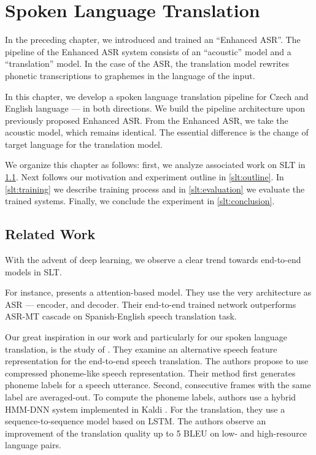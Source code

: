 \chapter{Spoken Language Translation}
\label{chap:slt}
In the preceding chapter, we introduced and trained an ``Enhanced ASR''. The pipeline of the Enhanced ASR system consists of an ``acoustic'' model and a ``translation'' model. In the case of the ASR, the translation model rewrites phonetic transcriptions to graphemes in the language of the input. 

In this chapter, we develop a spoken language translation pipeline for Czech and English language --- in both directions. We build the pipeline architecture upon previously proposed Enhanced ASR. From the Enhanced ASR, we take the acoustic model, which remains identical. The essential difference is the change of target language for the translation model. 

We organize this chapter as follows: first, we analyze associated work on SLT in \cref{slt:related}. Next follows our motivation and experiment outline in \cref{slt:outline}. In \cref{slt:training} we describe training process and in \cref{slt:evaluation} we evaluate the trained systems. Finally, we conclude the experiment in \cref{slt:conclusion}.

\section{Related Work}
\label{slt:related}

With the advent of deep learning, we observe a clear trend towards end-to-end models in SLT.

For instance,  presents a attention-based model. They use the very architecture as ASR --- encoder, and decoder. Their end-to-end trained network outperforms ASR-MT cascade on Spanish-English speech translation task.

Our great inspiration in our work and particularly for our spoken language translation, is the study of . They examine an alternative speech feature representation for the end-to-end speech translation. The authors propose to use compressed phoneme-like speech representation. Their method first generates phoneme labels for a speech utterance. Second, consecutive frames with the same label are averaged-out. To compute the phoneme labels, authors use a hybrid HMM-DNN system implemented in Kaldi . For the translation, they use a sequence-to-sequence model based on LSTM. The authors observe an improvement of the translation quality up to 5 BLEU on low- and high-resource language pairs.



